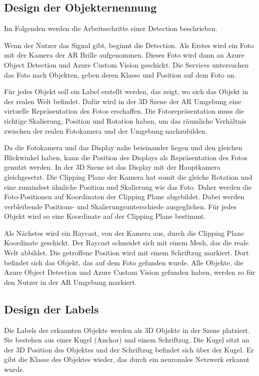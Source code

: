 \subsection{Design der Objekternennung}

Im Folgenden werden die Arbeitsschritte einer Detection beschrieben.

Wenn der Nutzer das Signal gibt, beginnt die Detection. Als Erstes wird ein Foto mit der Kamera der AR Brille aufgenommen. Dieses Foto wird dann an Azure Object Detection und Azure Custom Vision geschickt.
Die Services untersuchen das Foto nach Objekten, geben deren Klasse und Position auf dem Foto an.

Für jedes Objekt soll ein Label erstellt werden, das zeigt, wo sich das Objekt in der realen Welt befindet.
Dafür wird in der 3D Szene der AR Umgebung eine virtuelle Repräsentation des Fotos erschaffen. Die Fotorepräsentation muss die richtige Skalierung, Position und Rotation haben, um das räumliche Verhältnis zwischen der realen Fotokamera und der Umgebung nachzubilden.

Da die Fotokamera und das Display nahe beieinander liegen und den gleichen Blickwinkel haben, kann die Position des Displays als Repräsentation des Fotos genutzt werden. In der 3D Szene ist das Display mit der Hauptkamera gleichgesetzt. Die Clipping Plane der Kamera hat somit die gleiche Rotation und eine zumindest ähnliche Position und Skalierung wie das Foto. Daher werden die Foto-Positionen auf Koordinaten der Clipping Plane abgebildet. Dabei werden verbleibende Positions- und Skalierungsunterschiede ausgeglichen. Für jedes Objekt wird so eine Koordinate auf der Clipping Plane bestimmt.

Als Nächstes wird ein Raycast, von der Kamera aus, durch die Clipping Plane Koordinate geschickt. Der Raycast schneidet sich mit einem Mesh, das die reale Welt abbildet. Die getroffene Position wird mit einem Schriftzug markiert. Dort befindet sich das Objekt, das auf dem Foto gefunden wurde. Alle Objekte, die Azure Object Detection und Azure Custom Vision gefunden haben, werden so für den Nutzer in der AR Umgebung markiert.

\subsection{Design der Labels}

Die Labels der erkannten Objekte werden als 3D Objekte in der Szene platziert. Sie bestehen aus einer Kugel (Anchor) und einem Schriftzug. Die Kugel sitzt an der 3D Position des Objektes und der Schriftzug befindet sich über der Kugel. Er gibt die Klasse des Objektes wieder, das durch ein neuronales Netzwerk erkannt wurde.

